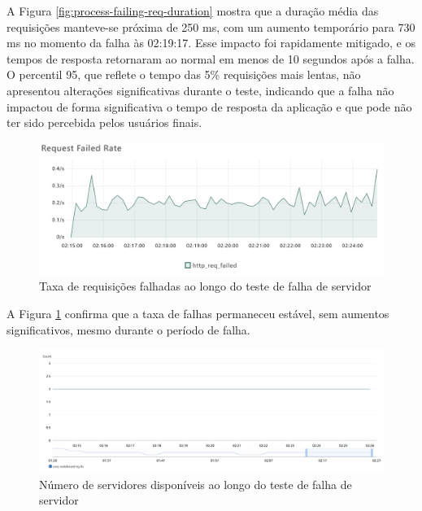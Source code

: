 A Figura \ref{fig:process-failing-req-duration} mostra que a duração média das requisições manteve-se próxima de 250 ms, com um aumento temporário para 730 ms no momento da falha às 02:19:17. Esse impacto foi rapidamente mitigado, e os tempos de resposta retornaram ao normal em menos de 10 segundos após a falha. O percentil 95, que reflete o tempo das 5\% requisições mais lentas, não apresentou alterações significativas durante o teste, indicando que a falha não impactou de forma significativa o tempo de resposta da aplicação e que pode não ter sido percebida pelos usuários finais.

\begin{figure}[H]
    \centering
    \includegraphics[width=1\textwidth]{assets/process-failing-test/req-failed-rate.png}
    \caption{Taxa de requisições falhadas ao longo do teste de falha de servidor}
    \label{fig:process-failing-req-failed-rate}
\end{figure}

A Figura \ref{fig:process-failing-req-failed-rate} confirma que a taxa de falhas permaneceu estável, sem aumentos significativos, mesmo durante o período de falha.

\begin{figure}[H]
    \centering
    \includegraphics[width=1\textwidth]{assets/process-failing-test/healthy-hosts.png}
    \caption{Número de servidores disponíveis ao longo do teste de falha de servidor}
    \label{fig:process-failing-healthy-hosts}
\end{figure}

